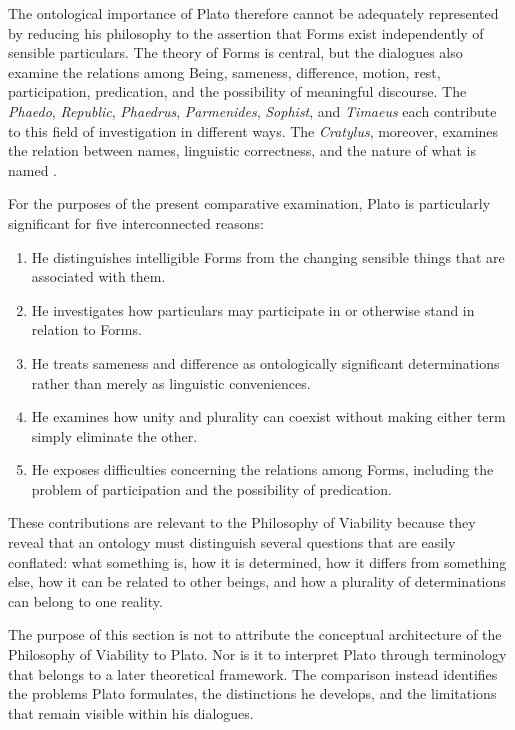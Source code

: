 The ontological importance of Plato therefore cannot be adequately
represented by reducing his philosophy to the assertion that Forms exist
independently of sensible particulars. The theory of Forms is central,
but the dialogues also examine the relations among Being, sameness,
difference, motion, rest, participation, predication, and the possibility
of meaningful discourse. The \textit{Phaedo}, \textit{Republic},
\textit{Phaedrus}, \textit{Parmenides}, \textit{Sophist}, and
\textit{Timaeus} each contribute to this field of investigation in
different ways. The \textit{Cratylus}, moreover, examines the relation
between names, linguistic correctness, and the nature of what is named
\citep{PlatoSophist,PlatoParmenides,PlatoTimaeus,PlatoCratylus}.

For the purposes of the present comparative examination, Plato is
particularly significant for five interconnected reasons:

\begin{enumerate}
    \item He distinguishes intelligible Forms from the changing sensible
    things that are associated with them.
    \item He investigates how particulars may participate in or otherwise
    stand in relation to Forms.
    \item He treats sameness and difference as ontologically significant
    determinations rather than merely as linguistic conveniences.
    \item He examines how unity and plurality can coexist without making
    either term simply eliminate the other.
    \item He exposes difficulties concerning the relations among Forms,
    including the problem of participation and the possibility of
    predication.
\end{enumerate}

These contributions are relevant to the Philosophy of Viability because
they reveal that an ontology must distinguish several questions that
are easily conflated: what something is, how it is determined, how it
differs from something else, how it can be related to other beings, and
how a plurality of determinations can belong to one reality.

The purpose of this section is not to attribute the conceptual
architecture of the Philosophy of Viability to Plato. Nor is it to
interpret Plato through terminology that belongs to a later theoretical
framework. The comparison instead identifies the problems Plato
formulates, the distinctions he develops, and the limitations that remain
visible within his dialogues.

